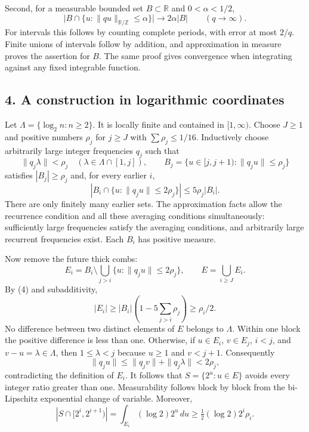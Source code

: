 Second, for a measurable bounded set $B\subset\mathbb R$ and $0<\alpha<1/2$,
\[
 \big|B\cap\{u:\|qu\|_{\mathbb R/\mathbb Z}\le\alpha\}\big|
 \longrightarrow 2\alpha|B|\qquad(q\to\infty). \tag{3}
\]
For intervals this follows by counting complete periods, with error at most $2/q$. Finite unions of intervals follow by addition, and approximation in measure proves the assertion for $B$. The same proof gives convergence when integrating against any fixed integrable function.

\subsection*{4. A construction in logarithmic coordinates}
Let $\Lambda=\{\log_2 n:n\ge2\}$. It is locally finite and contained in $[1,\infty)$. Choose $J\ge1$ and positive numbers $\rho_j$ for $j\ge J$ with $\sum\rho_j\le1/16$. Inductively choose arbitrarily large integer frequencies $q_j$ such that
\[
 \|q_j\lambda\|<\rho_j\quad(\lambda\in\Lambda\cap[1,j]),
 \qquad B_j=\{u\in[j,j+1):\|q_ju\|\le\rho_j\}
\]
satisfies $|B_j|\ge\rho_j$ and, for every earlier $i$,
\[
 |B_i\cap\{u:\|q_ju\|\le2\rho_j\}|\le5\rho_j|B_i|. \tag{4}
\]
There are only finitely many earlier sets. The approximation facts allow the recurrence condition and all these averaging conditions simultaneously: sufficiently large frequencies satisfy the averaging conditions, and arbitrarily large recurrent frequencies exist. Each $B_i$ has positive measure.

Now remove the future thick combs:
\[
 E_i=B_i\setminus\bigcup_{j>i}\{u:\|q_ju\|\le2\rho_j\},
 \qquad E=\bigcup_{i\ge J}E_i.
\]
By (4) and subadditivity,
\[
 |E_i|\ge |B_i|\left(1-5\sum_{j>i}\rho_j\right)\ge\rho_i/2. \tag{5}
\]
No difference between two distinct elements of $E$ belongs to $\Lambda$. Within one block the positive difference is less than one. Otherwise, if $u\in E_i$, $v\in E_j$, $i<j$, and $v-u=\lambda\in\Lambda$, then $1\le\lambda<j$ because $u\ge1$ and $v<j+1$. Consequently
\[
 \|q_ju\|\le\|q_jv\|+\|q_j\lambda\|<2\rho_j,
\]
contradicting the definition of $E_i$. It follows that $S=\{2^u:u\in E\}$ avoids every integer ratio greater than one. Measurability follows block by block from the bi-Lipschitz exponential change of variable. Moreover,
\[
 |S\cap[2^i,2^{i+1})|=\int_{E_i}(\log2)2^u\,du
 \ge\tfrac12(\log2)2^i\rho_i. \tag{6}
\]

